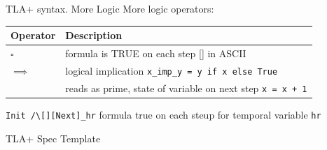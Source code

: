 \documentclass[12pt]{beamer}
\begin{document}
  \begin{frame}{TLA+ syntax. More Logic}
      More logic operators:
        \begin{table}
        \centering
            \begin{tabular}{@{} lp{9cm} @{}}
                Operator   & Description   \\ \hline
                $\square$  & formula is TRUE on each step [] in ASCII   \\
                $\implies$ & logical implication \texttt{x_imp_y = y if x else True}\\
                \boxed{$'$}& reads as prime, state of variable on next step \texttt{x = x + 1}
            \end{tabular}
        \end{table}
            \texttt{Init /\textbackslash [][Next]\_hr} formula true on each steup for temporal variable \texttt{hr}
  \end{frame}
  \begin{frame}{TLA+ Spec Template}
      \begin{center}
          \inputminted[linenos, fontsize=\scriptsize]{tla}{figures/template.tla}
      \end{center}
  \end{frame}
\end{document}
